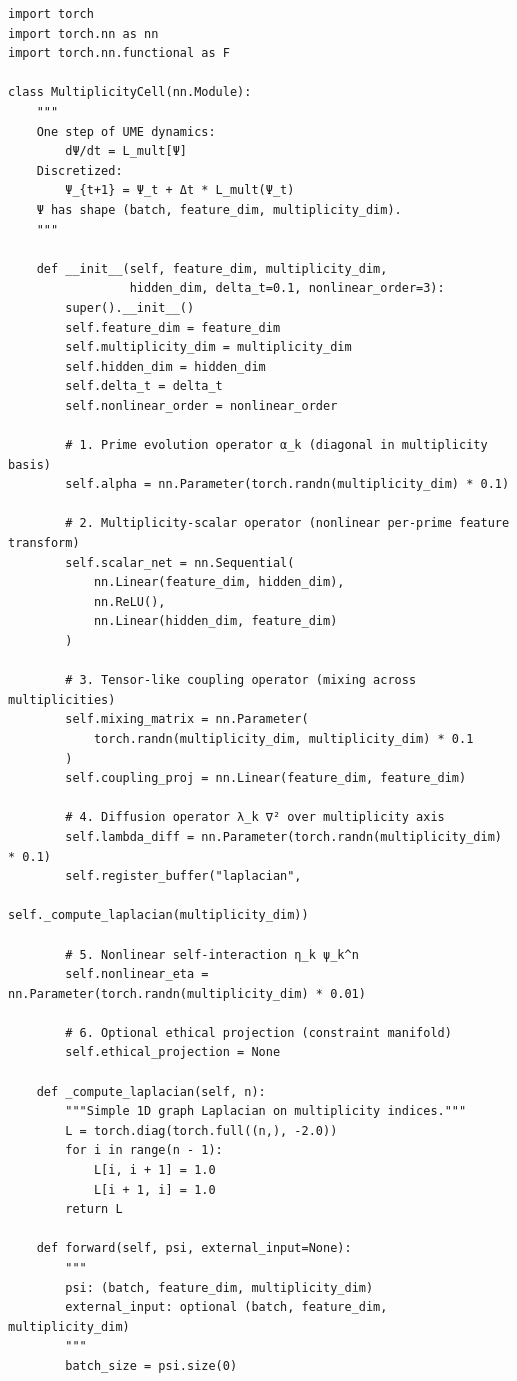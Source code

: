 \documentclass[11pt]{article}
\begin{document}
\begin{verbatim}
import torch
import torch.nn as nn
import torch.nn.functional as F

class MultiplicityCell(nn.Module):
    """
    One step of UME dynamics:
        dΨ/dt = L_mult[Ψ]
    Discretized:
        Ψ_{t+1} = Ψ_t + Δt * L_mult(Ψ_t)
    Ψ has shape (batch, feature_dim, multiplicity_dim).
    """

    def __init__(self, feature_dim, multiplicity_dim,
                 hidden_dim, delta_t=0.1, nonlinear_order=3):
        super().__init__()
        self.feature_dim = feature_dim
        self.multiplicity_dim = multiplicity_dim
        self.hidden_dim = hidden_dim
        self.delta_t = delta_t
        self.nonlinear_order = nonlinear_order

        # 1. Prime evolution operator α_k (diagonal in multiplicity basis)
        self.alpha = nn.Parameter(torch.randn(multiplicity_dim) * 0.1)

        # 2. Multiplicity-scalar operator (nonlinear per-prime feature transform)
        self.scalar_net = nn.Sequential(
            nn.Linear(feature_dim, hidden_dim),
            nn.ReLU(),
            nn.Linear(hidden_dim, feature_dim)
        )

        # 3. Tensor-like coupling operator (mixing across multiplicities)
        self.mixing_matrix = nn.Parameter(
            torch.randn(multiplicity_dim, multiplicity_dim) * 0.1
        )
        self.coupling_proj = nn.Linear(feature_dim, feature_dim)

        # 4. Diffusion operator λ_k ∇² over multiplicity axis
        self.lambda_diff = nn.Parameter(torch.randn(multiplicity_dim) * 0.1)
        self.register_buffer("laplacian",
                             self._compute_laplacian(multiplicity_dim))

        # 5. Nonlinear self-interaction η_k ψ_k^n
        self.nonlinear_eta = nn.Parameter(torch.randn(multiplicity_dim) * 0.01)

        # 6. Optional ethical projection (constraint manifold)
        self.ethical_projection = None

    def _compute_laplacian(self, n):
        """Simple 1D graph Laplacian on multiplicity indices."""
        L = torch.diag(torch.full((n,), -2.0))
        for i in range(n - 1):
            L[i, i + 1] = 1.0
            L[i + 1, i] = 1.0
        return L

    def forward(self, psi, external_input=None):
        """
        psi: (batch, feature_dim, multiplicity_dim)
        external_input: optional (batch, feature_dim, multiplicity_dim)
        """
        batch_size = psi.size(0)


\end{verbatim}
\end{document}
